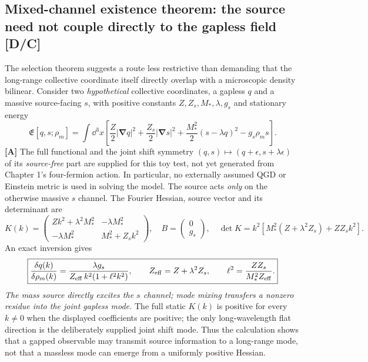 \documentclass[11pt,a4paper]{article}
\begin{document}
\subsection{Mixed-channel existence theorem: the source need not couple directly to the gapless field [D/C]}\label{sec:v09-mixing}
The selection theorem suggests a route less restrictive than demanding that the long-range collective coordinate itself directly overlap with a microscopic density bilinear. Consider two \emph{hypothetical} collective coordinates, a gapless $q$ and a massive source-facing $s$, with positive constants $Z,Z_s,M_*,\lambda,g_s$ and stationary energy
\begin{equation}\label{eq:v09-two-field-energy}
\boxed{\mathfrak E[q,s;\rho_m]=\int\dd^3x\left[\frac Z2|\bm\nabla q|^2+\frac{Z_s}{2}|\bm\nabla s|^2+\frac{M_*^2}{2}(s-\lambda q)^2-g_s\rho_m s\right].}
\end{equation}
\textbf{[A]} The full functional and the joint shift symmetry $(q,s)\mapsto(q+\epsilon,s+\lambda\epsilon)$ of its \emph{source-free} part are supplied for this toy test, not yet generated from Chapter 1's four-fermion action. In particular, no externally assumed QGD or Einstein metric is used in solving the model. The source acts \emph{only} on the otherwise massive $s$ channel. The Fourier Hessian, source vector and its determinant are
\begin{equation}\label{eq:v09-two-field-K}
K(k)=\begin{pmatrix}Zk^2+\lambda^2M_*^2&-\lambda M_*^2\\ -\lambda M_*^2&M_*^2+Z_s k^2\end{pmatrix},\quad B=\begin{pmatrix}0\\ g_s\end{pmatrix},\quad
\boxed{\det K=k^2\left[M_*^2(Z+\lambda^2 Z_s)+ZZ_s k^2\right].}
\end{equation}
An exact inversion gives
\begin{equation}\label{eq:v09-mixed-response}
\boxed{\frac{\delta q(k)}{\delta\rho_m(k)}=\frac{\lambda g_s}{Z_{\rm eff}\,k^2(1+\ell^2k^2)},\qquad
Z_{\rm eff}=Z+\lambda^2Z_s,\qquad
\ell^2=\frac{ZZ_s}{M_*^2Z_{\rm eff}}.}
\end{equation}
\emph{The mass source directly excites the $s$ channel; mode mixing transfers a nonzero residue into the joint gapless mode.} The full static $K(k)$ is positive for every $k\neq0$ when the displayed coefficients are positive; the only long-wavelength flat direction is the deliberately supplied joint shift mode. Thus the calculation shows that a gapped observable may transmit source information to a long-range mode, not that a massless mode can emerge from a uniformly positive Hessian.
\end{document}
